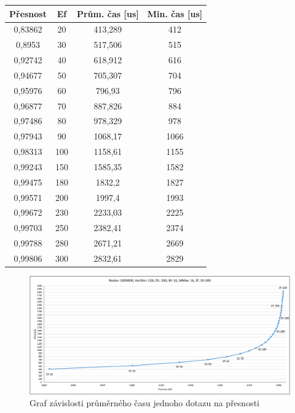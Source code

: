 \documentclass[czech,semestral,dept460,male,csharp,cpdeclaration]{diploma}
\begin{document}
		\begin{center}
			\begin{tabular}{c c c c}
				
				Přesnost & Ef & Prům. čas [us] & Min. čas [us] \\
				\midrule
				0,83862 & 20 & 413,289 & 412 \\
				0,8953 & 30 & 517,506 & 515 \\
				0,92742 & 40 & 618,912 & 616 \\
				0,94677 & 50 & 705,307 & 704 \\
				0,95976 & 60 & 796,93 & 796 \\
				0,96877 & 70 & 887,826 & 884 \\
				0,97486 & 80 & 978,329 & 978 \\
				0,97943 & 90 & 1068,17 & 1066 \\
				0,98313 & 100 & 1158,61 & 1155 \\
				0,99243 & 150 & 1585,35 & 1582 \\
				0,99475 & 180 & 1832,2 & 1827 \\
				0,99571 & 200 & 1997,4 & 1993 \\
				0,99672 & 230 & 2233,03 & 2225 \\
				0,99703 & 250 & 2382,41 & 2374 \\
				0,99788 & 280 & 2671,21 & 2669 \\
				0,99806 & 300 & 2832,61 & 2829 \\

			\end{tabular}
			\label{HNSWM}
		\end{center}
		
		\begin{figure}
			\centering
			\includegraphics[scale=0.5]{Figures/graf_hnsw.png}
			\caption{Graf závislosti průměrného času jednoho dotazu na přesnosti}
			\label{graf_hnsw}
		\end{figure}
	
\end{document}
